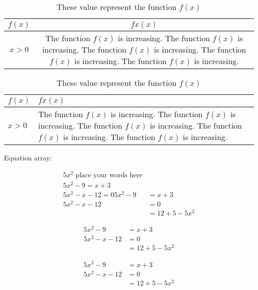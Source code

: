 \documentclass[11pt]{article}
\begin{document}
\begin{table}[H]
\centering
\caption{These value represent the function $f(x)$}
\def\arraystretch{2}

\begin{tabular}{|c|c|}
\hline
$f(x)$ & $fx(x)$\\ \hline
$x>0$ & The function $f(x)$ is increasing. The function $f(x)$ is increasing. The function $f(x)$ is increasing. The function $f(x)$ is increasing. The function $f(x)$ is increasing.\\\hline
\end{tabular}

\end{table}

\begin{table}[H]
\centering
\caption{These value represent the function $f(x)$}
\def\arraystretch{2}

\begin{tabular}{|l|p{4cm}|}
\hline
$f(x)$ & $fx(x)$\\ \hline
$x>0$ & The function $f(x)$ is increasing. The function $f(x)$ is increasing. The function $f(x)$ is increasing. The function $f(x)$ is increasing. The function $f(x)$ is increasing.\\\hline
\end{tabular}
\end{table}

Equation array:

\begin{align}
5x^2 \text{ place your words here} \\
5x^2-9 = x+3 \\
5x^2-x-12 = 0
5x^2-9 &= x+3 \\
5x^2-x-12 &= 0 \\
&=12 +5-5x^2
\end{align}

\begin{align*}
5x^2-9 &= x+3 \\
5x^2-x-12 &= 0 \\
&=12 +5-5x^2
\end{align*}

\begin{align}
5x^2-9 &= x+3 \\
5x^2-x-12 &= 0 \\
&=12 +5-5x^2
\end{align}
\end{document}
